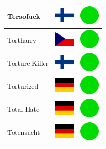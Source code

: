 \documentclass[12pt, a4paper, twoside]{report}
\begin{document}
\begin{center}
\begin{longtable}{|p{5cm}|p{2cm}|p{2cm}|}
 Torsofuck                                                  & \includegraphics[width=1cm]{../img/flags/fi} &   \includegraphics[width=1cm]{../likes/y} \\ \hline
 Tortharry                                                  & \includegraphics[width=1cm]{../img/flags/cz} &   \includegraphics[width=1cm]{../likes/y} \\ \hline
 Torture Killer                                             & \includegraphics[width=1cm]{../img/flags/fi} &   \includegraphics[width=1cm]{../likes/y} \\ \hline
 Torturized                                                 & \includegraphics[width=1cm]{../img/flags/de} &   \includegraphics[width=1cm]{../likes/y} \\ \hline
 Total Hate                                                 & \includegraphics[width=1cm]{../img/flags/de} &   \includegraphics[width=1cm]{../likes/y} \\ \hline
 Totensucht                                                 & \includegraphics[width=1cm]{../img/flags/de} &   \includegraphics[width=1cm]{../likes/y} \\ \hline

\end{longtable}
\end{center}
\end{document}

